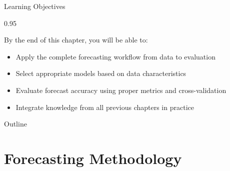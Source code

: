 \documentclass[9pt, aspectratio=169, t]{beamer}
\subtitle{Chapter 10: Comprehensive Review}
\begin{document}
{
\begin{frame}
    \titlepage
\end{frame}
}

\begin{frame}{Learning Objectives}
    \begin{cminipage}{0.95\textwidth}
\begin{block}{By the end of this chapter, you will be able to:}
\begin{itemize}\setlength{\itemsep}{0pt}
    \item Apply the complete forecasting workflow from data to evaluation
    \item Select appropriate models based on data characteristics
    \item Evaluate forecast accuracy using proper metrics and cross-validation
    \item Integrate knowledge from all previous chapters in practice
\end{itemize}
\end{block}
    \end{cminipage}
\end{frame}

\begin{frame}{Outline}
    \vspace{-0.3cm}
    {\small
    \tableofcontents
    }
\end{frame}

\section{Forecasting Methodology}
\end{document}
